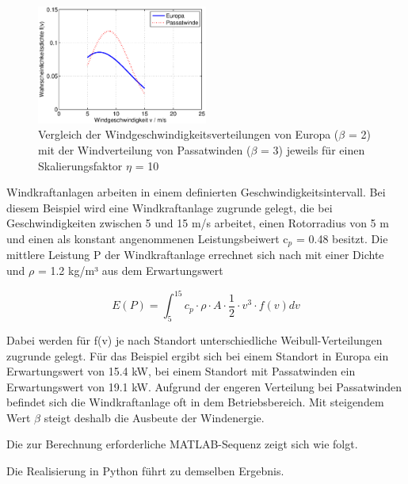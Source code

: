 \begin{figure}[H]
  \centerline{\includegraphics[width=0.5\textwidth]{Kapitel4/Bilder/image29}}
  \caption{Vergleich der Windgeschwindigkeitsverteilungen von Europa ($\beta$ = 2) mit der Windverteilung von Passatwinden ($\beta$ = 3) jeweils f\"{u}r einen Skalierungsfaktor $\eta$ = 10}
  \label{fig:Stetig_WeibullVerteilungWind}
\end{figure}


\noindent Windkraftanlagen arbeiten in einem definierten Geschwindigkeitsintervall. Bei diesem Beispiel wird eine Windkraftanlage zugrunde gelegt, die bei Geschwindigkeiten zwischen 5 und 15 m/s arbeitet, einen Rotorradius von 5 m und einen als konstant angenommenen Leistungsbeiwert c${}_{p}$ = 0.48 besitzt. Die mittlere Leistung P der Windkraftanlage errechnet sich nach mit einer Dichte und $\rho$ = 1.2 kg/m³ aus dem Erwartungswert

\begin{equation}\label{eq:fourhundredsninetytwo}
E(P)=\int _{5}^{15}c_{p} \cdot \rho \cdot A\cdot \dfrac{1}{2} \cdot v^{3} \cdot f(v) dv
\end{equation}

\noindent Dabei werden f\"{u}r f(v) je nach Standort unterschiedliche Weibull-Verteilungen zugrunde gelegt. F\"{u}r das Beispiel ergibt sich bei einem Standort in Europa ein Erwartungswert von 15.4 kW, bei einem Standort mit Passatwinden ein Erwartungswert von 19.1 kW. Aufgrund der engeren Verteilung bei Passatwinden befindet sich die Windkraftanlage oft in dem Betriebsbereich. Mit steigendem Wert $\beta$ steigt deshalb die Ausbeute der Windenergie. 

\clearpage

\noindent Die zur Berechnung erforderliche MATLAB-Sequenz zeigt sich wie folgt.



\noindent Die Realisierung in Python f\"{u}hrt zu demselben Ergebnis.



